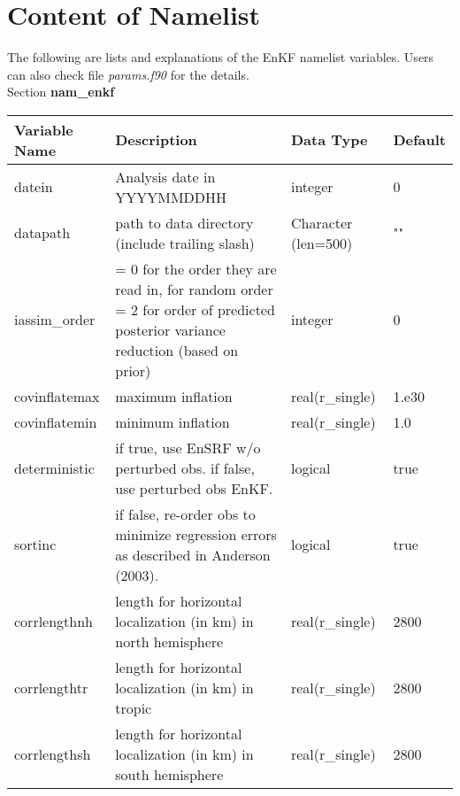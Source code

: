 \chapter{Content of Namelist}

The following are lists and explanations of the EnKF namelist variables. Users can also check file \textit{params.f90} for the details. \\

Section \textbf{nam\_enkf}
\begin{table}[htbp]
\centering
\begin{tabular}{p{3cm}p{7cm}p{2.5cm}p{1.5cm}}
\hline
Variable Name&Description&Data Type&Default\\
\hline
datein&Analysis date in YYYYMMDDHH&integer&0\\
datapath&path to data directory (include trailing slash)&Character (len=500) &""\\
iassim\_order&= 0 for the order they are read in,\newline
=1 for random order\newline
= 2 for order of predicted posterior variance reduction (based on prior) &integer&0\\
covinflatemax&maximum inflation&real(r\_single)&1.e30\\
covinflatemin&minimum inflation&real(r\_single)&1.0\\
deterministic&if true, use EnSRF w/o perturbed obs.\newline
                     if false, use perturbed obs EnKF. & logical & true\\
sortinc&if false, re-order obs to minimize regression 
                     errors as described in Anderson (2003). &logical &true\\
corrlengthnh&length for horizontal localization (in km) in north hemisphere&real(r\_single)&2800\\
corrlengthtr&length for horizontal localization (in km) in tropic&real(r\_single)&2800\\
corrlengthsh&length for horizontal localization (in km) in south hemisphere&real(r\_single)&2800\\
\hline
\end{tabular}
\end{table} 


